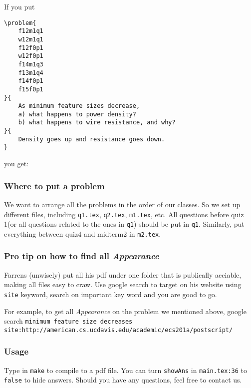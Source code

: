 If you put 
\begin{lstlisting}
\problem{
    f12m1q1
    w12m1q1
    f12f0p1
    w12f0p1
    f14m1q3
    f13m1q4
    f14f0p1
    f15f0p1
}{
    As minimum feature sizes decrease, 
    a) what happens to power density?
    b) what happens to wire resistance, and why?
}{
    Density goes up and resistance goes down.
}
\end{lstlisting}
you get:


\subsubsection*{Where to put a problem}

We want to arrange all the problems in the order of our classes.
So we set up different files, including \texttt{q1.tex}, \texttt{q2.tex}, \texttt{m1.tex}, etc.
All questions before quiz 1(or all questions related to the ones in \texttt{q1}) should be put in \texttt{q1}.
Similarly, put everything between quiz4 and midterm2 in \texttt{m2.tex}.

\subsubsection*{Pro tip on how to find all \textit{Appearance}}

Farrens (unwisely) put all his pdf under one folder that is publically acciable, making all files easy to craw.
Use google search to target on his website using \texttt{site} keyword, search on important key word and you are good to go.

For example, to get all \textit{Appearance} on the problem we mentioned above, google search \texttt{minimum feature size decreases site:http://american.cs.ucdavis.edu/academic/ecs201a/postscript/}


\subsubsection*{Usage}

Type in \lstinline{make} to compile to a pdf file. 
You can turn \texttt{showAns} in \texttt{main.tex:36} to \texttt{false} to hide answers.
Should you have any questions, feel free to contact us.